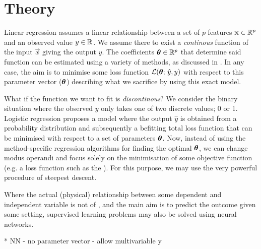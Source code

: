 \section{Theory}\label{sec:theory}

Linear regression assumes a linear relationship between a set of $p$ features $\vec{x}\in\RR[p]$ and an observed value $y\in\RR$. We assume there to exist a \textit{continous} function of the input $\vec{x}$ giving the output $\hat{y}$. The coefficients $\svec{\theta}\in\RR[p]$ that determine said function can be estimated using a variety of methods, as discussed in \projectOne. In any case, the aim is to minimise some loss function $\mathcal{L}(\svec{\theta};\,\hat{y}, y)$ with respect to this parameter vector ($\svec{\theta}$) describing what we sacrifice by using this exact model. 

What if the function we want to fit is \textit{discontinous}? We consider the binary situation where the observed $y$ only takes one of two discrete values; 0 or 1. Logistic regression proposes a model where the output $\hat{y}$ is obtained from  a probability distribution and subsequently a befitting total loss function that can be minimised with respect to a set of parameters $\svec{\theta}$. Now, instead of using the method-specific regression algorithms for finding the optimal $\svec{\theta}$, we can change modus operandi and focus solely on the minimisation of some objective function (e.g. a loss function such as the ). For this purpose, we may use the very powerful procedure of steepest descent.

Where the actual (physical) relationship between some dependent and independent variable is not of , and the main aim is to predict the outcome given some setting, supervised learning problems may also be solved using neural networks. 

\par{*} NN - no parameter vector - allow multivariable y



